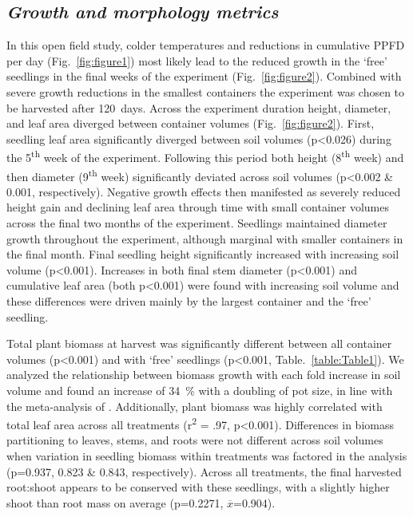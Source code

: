 \documentclass[a4paper]{article}\usepackage[]{graphicx}\usepackage[]{color}
\begin{document}
\subsection*{\textit{Growth and morphology metrics}}
In this open field study, colder temperatures and reductions in cumulative PPFD per day (Fig.~\ref{fig:figure1}) most likely lead to the reduced growth in the ‘free’ seedlings in the final weeks of the experiment (Fig.~\ref{fig:figure2}).  Combined with severe growth reductions in the smallest containers the experiment was chosen to be harvested after 120~days. Across the experiment duration height, diameter, and leaf area diverged between container volumes (Fig.~\ref{fig:figure2}).  First, seedling leaf area significantly diverged between soil volumes (p\textless0.026) during the 5\textsuperscript{th} week of the experiment. Following this period both height (8\textsuperscript{th} week) and then diameter (9\textsuperscript{th} week) significantly deviated across soil volumes (p\textless0.002 \& 0.001, respectively).  Negative growth effects then manifested as severely reduced height gain and declining leaf area through time with small container volumes across the final two months of the experiment. Seedlings maintained diameter growth throughout the experiment, although marginal with smaller containers in the final month. Final seedling height significantly increased with increasing soil volume (p\textless0.001).  Increases in both final stem diameter (p\textless0.001) and cumulative leaf area (both p\textless0.001) were found with increasing soil volume and these differences were driven mainly by the largest container and the ‘free’ seedling.

Total plant biomass at harvest was significantly different between all container volumes (p\textless0.001) and with ‘free’ seedlings (p\textless0.001, Table.~\ref{table:Table1}). We analyzed the relationship between biomass growth with each fold increase in soil volume and found an increase of 34~\% with a doubling of pot size, in line with the meta-analysis of \citet{poorter2012pot}. Additionally, plant biomass was highly correlated with total leaf area across all treatments (r\textsuperscript{2} = .97, p\textless0.001). Differences in biomass partitioning to leaves, stems, and roots were not different across soil volumes when variation in seedling biomass within treatments was factored in the analysis (p=0.937, 0.823 \& 0.843, respectively). Across all treatments, the final harvested root:shoot appears to be conserved with these seedlings, with a slightly higher shoot than root mass on average (p=0.2271, $\overline{x}$=0.904).
\end{document}
